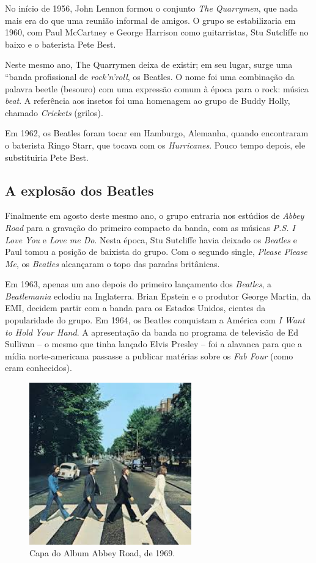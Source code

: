 No início de 1956, John Lennon formou o conjunto {\it The Quarrymen}, que nada mais era do que uma reunião 
informal 
de amigos. O grupo se estabilizaria em 1960, com Paul McCartney e George Harrison como guitarristas, Stu 
Sutcliffe no baixo e o baterista Pete Best.

Neste mesmo ano, The Quarrymen deixa de existir; em seu lugar, surge uma “banda profissional de 
{\it rock’n’roll}, os Beatles. O nome foi uma combinação da palavra beetle (besouro) com uma expressão 
comum à 
época para o rock: música {\it beat}. A referência aos insetos foi uma homenagem ao grupo de Buddy Holly, 
chamado 
{\it Crickets} (grilos).

Em 1962, os Beatles foram tocar em Hamburgo, Alemanha, quando encontraram o baterista Ringo Starr, que 
tocava com os {\it Hurricanes}. Pouco tempo depois, ele substituiria Pete Best.

\subsection{A explosão dos Beatles}

Finalmente em agosto deste mesmo ano, o grupo entraria nos estúdios de {\it Abbey Road} para a gravação 
do 
primeiro compacto da banda, com as músicas {\it P.S. I Love You} e {\it Love me Do}. Nesta época, Stu 
Sutcliffe havia 
deixado os {\it Beatles} e Paul tomou a posição de baixista do grupo.
Com o segundo single, {\it Please Please Me}, os {\it Beatles} alcançaram o topo das paradas britânicas.

Em 1963, apenas um ano depois do primeiro lançamento dos {\it Beatles}, a {\it Beatlemania} eclodiu na 
Inglaterra. 
Brian Epstein e o produtor George Martin, da EMI, decidem partir com a banda para os Estados Unidos, cientes 
da popularidade do grupo. Em 1964, os Beatles conquistam a América com {\it I Want to Hold Your Hand}. A 
apresentação da banda no programa de televisão de Ed Sullivan – o mesmo que tinha lançado Elvis Presley – 
foi a alavanca para que a mídia norte-americana passasse a publicar matérias sobre os {\it Fab Four} (como 
eram 
conhecidos).

\begin{figure}[!htb]
  \centering
  \includegraphics[width=7cm]{imagens/abbey_road}
  \caption{Capa do Album Abbey Road, de 1969.}
  \label{fig:abbeyroad}
\end{figure}

